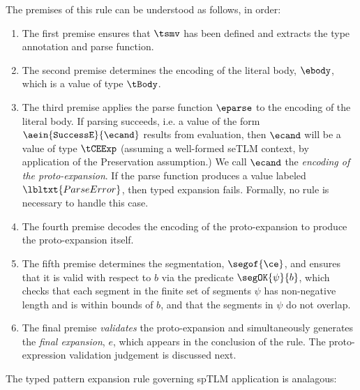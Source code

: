 \documentclass[acmsmall,10pt,review,anonymous]{acmart}\settopmatter{printfolios=true}
\begin{document}
The premises of this rule can be understood as follows, in order:
\begin{enumerate}
\item The first premise ensures that $\tsmv$ has been defined and extracts the type annotation and parse function.
\item The second premise determines the encoding of the literal body, $\ebody$, which is a value of type $\tBody$.
\item The third premise applies the parse function $\eparse$ to the encoding of the literal body. If parsing succeeds, i.e. a value of the form $\aein{\mathtt{SuccessE}}{\ecand}$ results from evaluation, then $\ecand$ will be a value of type $\tCEExp$ (assuming a well-formed seTLM context, by application of the Preservation assumption.) We call $\ecand$ the \emph{encoding of the proto-expansion}. If the parse function produces a value labeled $\lbltxt{ParseError}$, then typed expansion fails. Formally, no rule is necessary to handle this case. 

\item The fourth premise decodes the encoding of the proto-expansion to produce the {proto-expansion} itself.

\item The fifth premise determines the segmentation, $\segof{\ce}$, and ensures that it is valid with respect to $b$ via the predicate $\segOK{\psi}{b}$, which  checks that each segment in the finite set of segments $\psi$ has non-negative length and is within bounds of $b$, and that the segments in $\psi$ do not overlap.

\item The final premise \emph{validates} the proto-expansion and simultaneously generates the \emph{final expansion}, $e$, which appears in the conclusion of the rule. The proto-expression validation judgement is discussed next.
\end{enumerate}

The typed pattern expansion rule governing spTLM application is analagous:
\begin{mathpar}
\end{mathpar}
\end{document}
